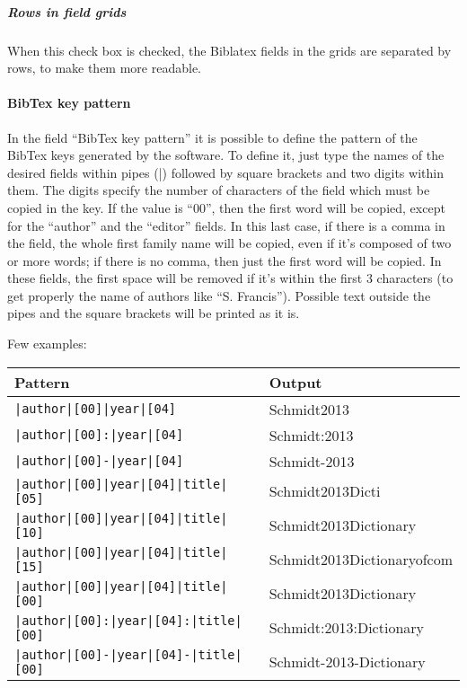 \documentclass[a4paper,12pt]{report}
\begin{document}
\subparagraph{Rows in field grids} When this check box is checked, the Biblatex fields in the grids are separated by rows, to make them more readable.

\paragraph{BibTex key pattern}

In the field “BibTex key pattern” it is possible to define the pattern of the BibTex keys generated by the software. To define it, just type the names of the desired fields within pipes (|) followed by square brackets and two digits within them. The digits specify the number of characters of the field which must be copied in the key. If the value is “00”, then the first word will be copied, except for the “author” and the “editor” fields. In this last case, if there is a comma in the field, the whole first family name will be copied, even if it's composed of two or more words; if there is no comma, then just the first word will be copied. In these fields, the first space will be removed if it's within the first 3 characters (to get properly the name of authors like “S. Francis”). Possible text outside the pipes and the square brackets will be printed as it is.

Few examples:

\begin{center}
   \begin{tabular}{ll}
     \toprule
     Pattern & Output \\
     \midrule
     \texttt{|author|[00]|year|[04]} & Schmidt2013 \\
     \texttt{|author|[00]:|year|[04]} & Schmidt:2013\\
     \texttt{|author|[00]-|year|[04]} & Schmidt-2013\\
     \texttt{|author|[00]|year|[04]|title|[05]} & Schmidt2013Dicti\\
     \texttt{|author|[00]|year|[04]|title|[10]} & Schmidt2013Dictionary\\
     \texttt{|author|[00]|year|[04]|title|[15]} & Schmidt2013Dictionaryofcom\\
     \texttt{|author|[00]|year|[04]|title|[00]} & Schmidt2013Dictionary\\
     \texttt{|author|[00]:|year|[04]:|title|[00]} & Schmidt:2013:Dictionary\\
     \texttt{|author|[00]-|year|[04]-|title|[00]} & Schmidt-2013-Dictionary\\
     \bottomrule
  \end{tabular}
\end{center}
\end{document}
